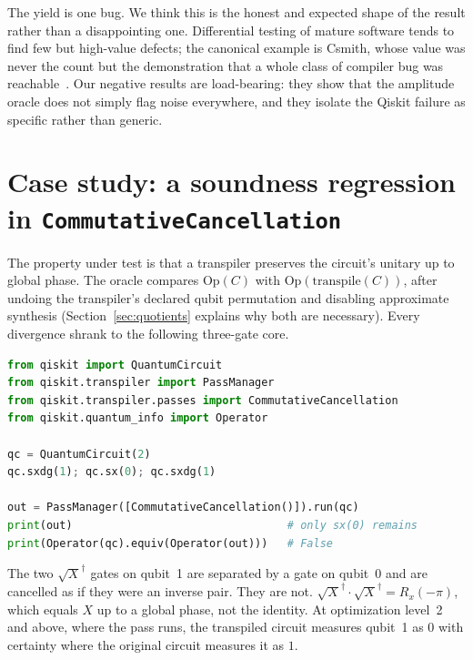 \documentclass[11pt]{article}
\begin{document}
The yield is one bug. We think this is the honest and expected shape of
the result rather than a disappointing one. Differential testing of
mature software tends to find few but high-value defects; the canonical
example is Csmith, whose value was never the count but the demonstration
that a whole class of compiler bug was reachable~\cite{csmith}. Our
negative results are load-bearing: they show that the amplitude oracle
does not simply flag noise everywhere, and they isolate the Qiskit
failure as specific rather than generic.

\section{Case study: a soundness regression in \texttt{CommutativeCancellation}}
\label{sec:case}

The property under test is that a transpiler preserves the circuit's
unitary up to global phase. The oracle compares $\mathrm{Op}(C)$ with
$\mathrm{Op}(\mathrm{transpile}(C))$, after undoing the transpiler's
declared qubit permutation and disabling approximate synthesis
(Section~\ref{sec:quotients} explains why both are necessary). Every
divergence shrank to the following three-gate core.

\begin{lstlisting}[language=Python]
from qiskit import QuantumCircuit
from qiskit.transpiler import PassManager
from qiskit.transpiler.passes import CommutativeCancellation
from qiskit.quantum_info import Operator

qc = QuantumCircuit(2)
qc.sxdg(1); qc.sx(0); qc.sxdg(1)

out = PassManager([CommutativeCancellation()]).run(qc)
print(out)                                 # only sx(0) remains
print(Operator(qc).equiv(Operator(out)))   # False
\end{lstlisting}

The two $\sqrt{X}^\dagger$ gates on qubit~1 are separated by a gate on
qubit~0 and are cancelled as if they were an inverse pair. They are not.
$\sqrt{X}^\dagger \cdot \sqrt{X}^\dagger = R_x(-\pi)$, which equals $X$ up
to a global phase, not the identity. At optimization level~2 and above,
where the pass runs, the transpiled circuit measures qubit~1 as $0$ with
certainty where the original circuit measures it as $1$.
\end{document}
